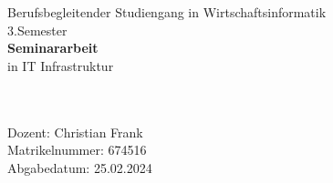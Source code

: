 \documentclass[
    12pt,
    bibliography=totoc,
    listof=totoc
]{scrartcl}
\begin{document}
\begin{titlepage}
{    %
        \begin{center}
            \normalsize{Berufsbegleitender Studiengang in Wirtschaftsinformatik} \\
            3.Semester \\
            \vspace{10mm}
            \large{\textbf{Seminararbeit}}\\
            in IT Infrastruktur \\
            \vspace{15mm}
            \fontsize{20pt}{20pt}\selectfont
            \textbf{\@title} \\
            \vspace{2mm}
            \fontsize{15pt}{15pt}\selectfont
            \@subtitle \\
            \vspace{15mm}
            \fontsize{15pt}{15pt}\selectfont
            \@author
            \vspace{30mm}
        \end{center}




        
        \begin{flushleft}
            \fontsize{12pt}{12pt}
            \selectfont
            Dozent: Christian Frank \\
             \vspace{5mm}
             Matrikelnummer: 674516\\
             \vspace{5mm}
             Abgabedatum: 25.02.2024\\
        \end{flushleft}
 
}\end{titlepage}
\end{document}
